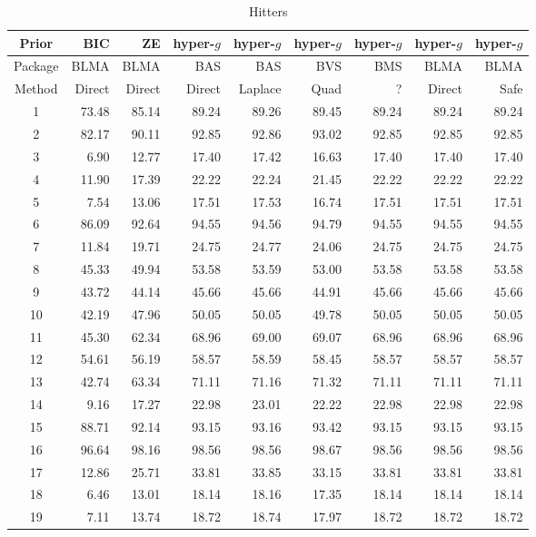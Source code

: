 \begin{table}[ht]
	\centering
	{\small 	
	\begin{tabular}{c|r|r|rrrrrr}
		Prior   & BIC    & ZE     & hyper-$g$ & hyper-$g$ & hyper-$g$  & hyper-$g$ & hyper-$g$ & hyper-$g$ \\
		\hline 
		Package & BLMA   & BLMA   & BAS       & BAS       & BVS        & BMS       & BLMA      & BLMA       \\
		\hline 
		Method  & Direct & Direct & Direct    & Laplace   & Quad & ?         & Direct    & Safe      \\ 
		\hline
		1 & 73.48 & 85.14 & 89.24 & 89.26 & 89.45 & 89.24 & 89.24 & 89.24 \\ 
		2 & 82.17 & 90.11 & 92.85 & 92.86 & 93.02 & 92.85 & 92.85 & 92.85 \\ 
		3 & 6.90 & 12.77 & 17.40 & 17.42 & 16.63 & 17.40 & 17.40 & 17.40 \\ 
		4 & 11.90 & 17.39 & 22.22 & 22.24 & 21.45 & 22.22 & 22.22 & 22.22 \\ 
		5 & 7.54 & 13.06 & 17.51 & 17.53 & 16.74 & 17.51 & 17.51 & 17.51 \\ 
		6 & 86.09 & 92.64 & 94.55 & 94.56 & 94.79 & 94.55 & 94.55 & 94.55 \\ 
		7 & 11.84 & 19.71 & 24.75 & 24.77 & 24.06 & 24.75 & 24.75 & 24.75 \\ 
		8 & 45.33 & 49.94 & 53.58 & 53.59 & 53.00 & 53.58 & 53.58 & 53.58 \\ 
		9 & 43.72 & 44.14 & 45.66 & 45.66 & 44.91 & 45.66 & 45.66 & 45.66 \\ 
		10 & 42.19 & 47.96 & 50.05 & 50.05 & 49.78 & 50.05 & 50.05 & 50.05 \\ 
		11 & 45.30 & 62.34 & 68.96 & 69.00 & 69.07 & 68.96 & 68.96 & 68.96 \\ 
		12 & 54.61 & 56.19 & 58.57 & 58.59 & 58.45 & 58.57 & 58.57 & 58.57 \\ 
		13 & 42.74 & 63.34 & 71.11 & 71.16 & 71.32 & 71.11 & 71.11 & 71.11 \\ 
		14 & 9.16 & 17.27 & 22.98 & 23.01 & 22.22 & 22.98 & 22.98 & 22.98 \\ 
		15 & 88.71 & 92.14 & 93.15 & 93.16 & 93.42 & 93.15 & 93.15 & 93.15 \\ 
		16 & 96.64 & 98.16 & 98.56 & 98.56 & 98.67 & 98.56 & 98.56 & 98.56 \\ 
		17 & 12.86 & 25.71 & 33.81 & 33.85 & 33.15 & 33.81 & 33.81 & 33.81 \\ 
		18 & 6.46 & 13.01 & 18.14 & 18.16 & 17.35 & 18.14 & 18.14 & 18.14 \\ 
		19 & 7.11 & 13.74 & 18.72 & 18.74 & 17.97 & 18.72 & 18.72 & 18.72 \\ 
		\hline
	\end{tabular}
}
	\caption{Hitters}
	\label{tab:HittersResults1}
\end{table}

